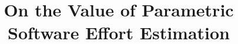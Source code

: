 \documentclass{sig-alternate}
\begin{document}
  
%


\title{On the Value of Parametric Software Effort Estimation}


%
%
%
%
%
\end{document}
